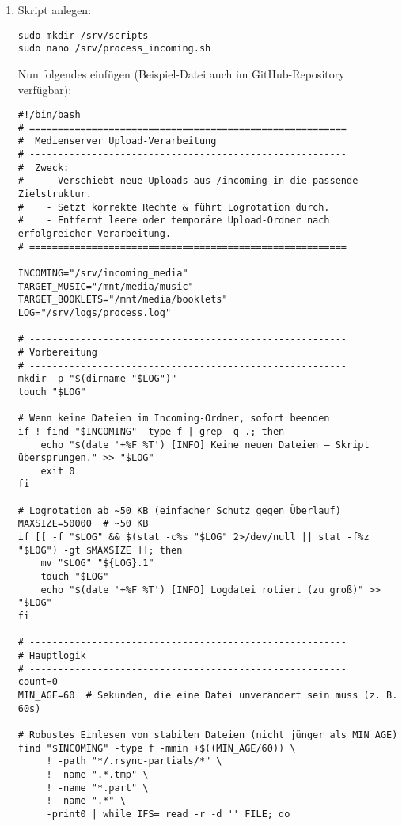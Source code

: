 \documentclass[12pt,a4paper]{report}
\begin{document}
  \begin{enumerate}
    \item Skript anlegen:
    \begin{verbatim}
sudo mkdir /srv/scripts
sudo nano /srv/process_incoming.sh
    \end{verbatim}

    Nun folgendes einfügen (Beispiel-Datei auch im GitHub-Repository verfügbar):
    \begin{verbatim}
#!/bin/bash
# ========================================================
#  Medienserver Upload-Verarbeitung
# --------------------------------------------------------
#  Zweck:
#    - Verschiebt neue Uploads aus /incoming in die passende Zielstruktur.
#    - Setzt korrekte Rechte & führt Logrotation durch.
#    - Entfernt leere oder temporäre Upload-Ordner nach erfolgreicher Verarbeitung.
# ========================================================

INCOMING="/srv/incoming_media"
TARGET_MUSIC="/mnt/media/music"
TARGET_BOOKLETS="/mnt/media/booklets"
LOG="/srv/logs/process.log"

# --------------------------------------------------------
# Vorbereitung
# --------------------------------------------------------
mkdir -p "$(dirname "$LOG")"
touch "$LOG"

# Wenn keine Dateien im Incoming-Ordner, sofort beenden
if ! find "$INCOMING" -type f | grep -q .; then
    echo "$(date '+%F %T') [INFO] Keine neuen Dateien – Skript übersprungen." >> "$LOG"
    exit 0
fi

# Logrotation ab ~50 KB (einfacher Schutz gegen Überlauf)
MAXSIZE=50000  # ~50 KB
if [[ -f "$LOG" && $(stat -c%s "$LOG" 2>/dev/null || stat -f%z "$LOG") -gt $MAXSIZE ]]; then
    mv "$LOG" "${LOG}.1"
    touch "$LOG"
    echo "$(date '+%F %T') [INFO] Logdatei rotiert (zu groß)" >> "$LOG"
fi

# --------------------------------------------------------
# Hauptlogik 
# --------------------------------------------------------
count=0
MIN_AGE=60  # Sekunden, die eine Datei unverändert sein muss (z. B. 60s)

# Robustes Einlesen von stabilen Dateien (nicht jünger als MIN_AGE)
find "$INCOMING" -type f -mmin +$((MIN_AGE/60)) \
     ! -path "*/.rsync-partials/*" \
     ! -name ".*.tmp" \
     ! -name "*.part" \
     ! -name ".*" \
     -print0 | while IFS= read -r -d '' FILE; do


\end{verbatim}
\end{enumerate}
\end{document}
